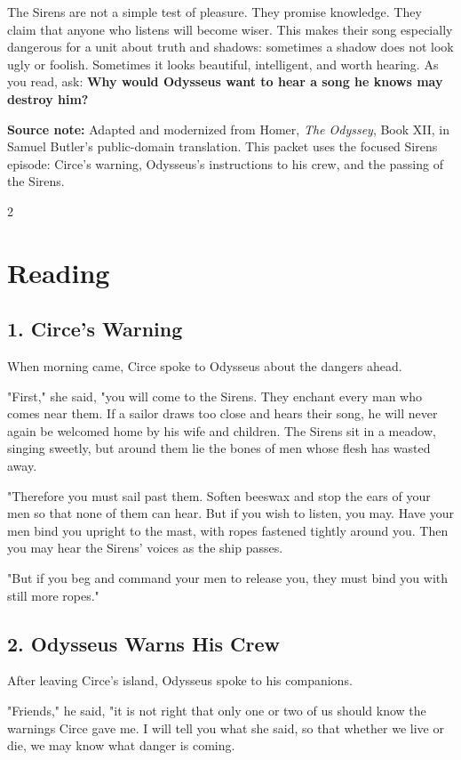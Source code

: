 \documentclass[12pt]{article}
\newcommand{\focusbox}[1]{%
\vspace{0.4em}\noindent\colorbox{gray!12}{\begin{minipage}{0.96\linewidth}#1\end{minipage}}\vspace{0.5em}}
\begin{document}
The Sirens are not a simple test of pleasure. They promise knowledge. They claim that anyone who listens will become wiser. This makes their song especially dangerous for a unit about truth and shadows: sometimes a shadow does not look ugly or foolish. Sometimes it looks beautiful, intelligent, and worth hearing. As you read, ask: \textbf{Why would Odysseus want to hear a song he knows may destroy him?}

\focusbox{\textbf{Source note:} Adapted and modernized from Homer, \textit{The Odyssey}, Book XII, in Samuel Butler's public-domain translation. This packet uses the focused Sirens episode: Circe's warning, Odysseus's instructions to his crew, and the passing of the Sirens.}

\begin{multicols}{2}
\section*{Reading}

\subsection*{1. Circe's Warning}
When morning came, Circe spoke to Odysseus about the dangers ahead.

"First," she said, "you will come to the Sirens. They enchant every man who comes near them. If a sailor draws too close and hears their song, he will never again be welcomed home by his wife and children. The Sirens sit in a meadow, singing sweetly, but around them lie the bones of men whose flesh has wasted away.

"Therefore you must sail past them. Soften beeswax and stop the ears of your men so that none of them can hear. But if you wish to listen, you may. Have your men bind you upright to the mast, with ropes fastened tightly around you. Then you may hear the Sirens' voices as the ship passes.

"But if you beg and command your men to release you, they must bind you with still more ropes."

\subsection*{2. Odysseus Warns His Crew}
After leaving Circe's island, Odysseus spoke to his companions.

"Friends," he said, "it is not right that only one or two of us should know the warnings Circe gave me. I will tell you what she said, so that whether we live or die, we may know what danger is coming.


\end{multicols}
\end{document}
